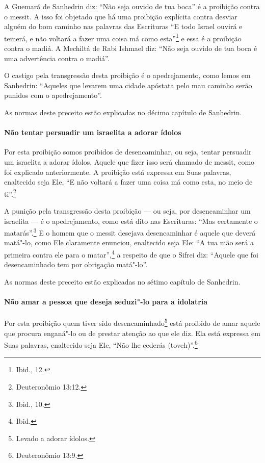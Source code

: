 \begin{multicols}{2}
A Guemará\starr{} de Sanhedrin\starr{} diz: ``Não seja ouvido de tua boca'' é a
proibição contra o messit\starr. A isso foi objetado que há uma proibição
explícita contra desviar alguém do bom caminho nas palavras das
Escrituras ``E todo Israel ouvirá e temerá, e não voltará a fazer uma
coisa má como esta''\footnote{Ibid., 12.} e essa é a proibição contra o madiá\starr.
A Mechiltá\starr{} de Rabi Ishmael\starr{} diz: ``Não seja ouvido de tua boca é uma
advertência contra o madiá\starr''.

O castigo pela transgressão desta proibição é o apedrejamento, como
lemos em Sanhedrin\starr: ``Aqueles que levarem uma cidade apóstata pelo mau
caminho serão punidos com o apedrejamento''.

As normas deste preceito estão explicadas no décimo capítulo de Sanhedrin\starr.

\paragraph{Não tentar persuadir um israelita a adorar ídolos}

Por esta proibição somos proibidos de desencaminhar, ou seja, tentar
persuadir um israelita a adorar ídolos. Aquele que fizer isso será
chamado de messit\starr, como foi explicado anteriormente. A proibição
está expressa em Suas palavras, enaltecido seja Ele, ``E não voltará a
fazer uma coisa má como esta, no meio de ti''.\footnote{Deuteronômio 13:12.}

A punição pela transgressão desta proibição --- ou seja, por
desencaminhar um israelita --- é o apedrejamento, como está dito nas
Escrituras: ``Mas certamente o matarás''.\footnote{Ibid., 10.} E o homem que o
messit\starr{} desejava desencaminhar é aquele que deverá matá"-lo, como Ele
claramente enunciou, enaltecido seja Ele: ``A tua mão será a primeira
contra ele para o matar'',\footnote{Ibid.} a respeito de que o Sifrei\starr{} diz:
``Aquele que foi desencaminhado tem por obrigação matá"-lo''.

As normas deste preceito estão explicadas no sétimo capítulo de Sanhedrin\starr.

\paragraph{Não amar a pessoa que deseja seduzi"-lo para a idolatria}

Por esta proibição quem tiver sido desencaminhado\footnote{Levado a adorar ídolos.} está proibido
de amar aquele que procura enganá"-lo ou de prestar atenção ao que ele
diz. Ela está expressa em Suas palavras, enaltecido seja Ele, ``Não lhe
cederás (toveh)''.\footnote{Deuteronômio 13:9.}


\end{multicols}
